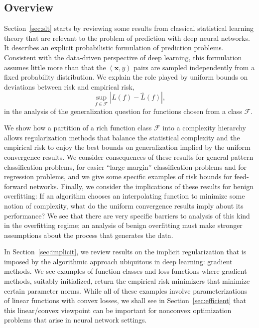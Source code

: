 \subsection{Overview}

Section~\ref{sec:slt} starts by reviewing some results from classical statistical learning theory that are relevant to the problem of prediction with deep neural networks. It describes an explicit probabilistic formulation of prediction problems. Consistent with the data-driven perspective of deep learning, this formulation assumes little more than that the $({\boldsymbol x},y)$ pairs are sampled independently from a fixed probability distribution.  We explain the role played by uniform bounds on deviations between risk and empirical risk,
  \[
    \sup_{f\in {\mathcal F}}\left| L(f) - \widehat L(f)\right|,
  \]
in the analysis of the generalization question for functions chosen from a class ${\mathcal F}$.

We show how a partition of a rich function class ${\mathcal F}$ into a complexity hierarchy allows regularization methods that balance the statistical complexity and the empirical risk to enjoy the best bounds on generalization implied by the uniform convergence results.  We consider consequences of these results for general pattern classification problems, for easier ``large margin'' classification problems and for regression problems, and we give some specific examples of risk bounds for feed-forward networks.  Finally, we consider the implications of these results for benign overfitting: If an algorithm chooses an interpolating function to minimize some notion of complexity, what do the uniform convergence results imply about its performance? We see that there are very specific barriers to analysis of this kind in the overfitting regime; an analysis of benign overfitting must make stronger assumptions about the process that generates the data.

In Section~\ref{sec:implicit}, we review results on the implicit regularization that is imposed by the algorithmic approach ubiquitous in deep learning: gradient methods. We see examples of function classes and loss functions where gradient methods, suitably initialized, return the empirical risk minimizers that minimize certain parameter norms. While all of these examples involve parameterizations of linear functions with convex losses, we shall see in Section~\ref{sec:efficient} that this linear/convex viewpoint can be important for nonconvex optimization problems that arise in neural network settings.

